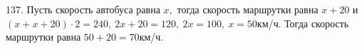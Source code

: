 137. Пусть скорость автобуса равна $x,$ тогда скорость маршрутки равна $x+20$ и $(x+x+20)\cdot2=240,\ 2x+20=120,\ 2x=100,\ x=50$км/ч. Тогда скорость маршрутки равна $50+20=70$км/ч.\\
